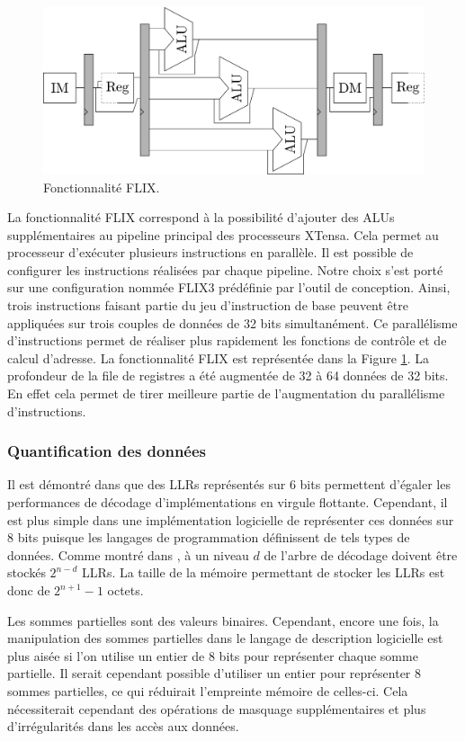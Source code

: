 \begin{figure}
\centering
\includegraphics[width=\textwidth]{main/ch3_fig/flix}
\caption{Fonctionnalité FLIX.}
\label{fig:flix}
\end{figure}

La fonctionnalité FLIX correspond à la possibilité d'ajouter des ALUs supplémentaires au pipeline principal des processeurs XTensa. Cela permet au processeur d'exécuter plusieurs instructions en parallèle. Il est possible de configurer les instructions réalisées par chaque pipeline. Notre choix s'est porté sur une configuration nommée FLIX3 prédéfinie par l'outil de conception. Ainsi, trois instructions faisant partie du jeu d'instruction de base peuvent être appliquées sur trois couples de données de 32 bits simultanément. Ce parallélisme d'instructions permet de réaliser plus rapidement les fonctions de contrôle et de calcul d'adresse. La fonctionnalité FLIX est représentée dans la Figure \ref{fig:flix}.
La profondeur de la file de registres a été augmentée de 32 à 64 données de 32 bits. En effet cela permet de tirer meilleure partie de l'augmentation du parallélisme d'instructions.

\subsubsection{Quantification des données}
Il est démontré dans \cite{sarkis_fast_2014} que des LLRs représentés sur 6 bits permettent d'égaler les performances de décodage d'implémentations en virgule flottante. Cependant, il est plus simple dans une implémentation logicielle de représenter ces données sur 8 bits puisque les langages de programmation définissent de tels types de données. Comme montré dans \cite{leroux_hardware_2011}, à un niveau $d$ de l'arbre de décodage doivent être stockés $2^{n-d}$ LLRs. La taille de la mémoire permettant de stocker les LLRs est donc de $2^{n+1}-1$ octets.

Les sommes partielles sont des valeurs binaires. Cependant, encore une fois, la manipulation des sommes partielles dans le langage de description logicielle est plus aisée si l'on utilise un entier de 8 bits pour représenter chaque somme partielle. Il serait cependant possible d'utiliser un entier pour représenter 8 sommes partielles, ce qui réduirait l'empreinte mémoire de celles-ci. Cela nécessiterait cependant des opérations de masquage supplémentaires et plus d'irrégularités dans les accès aux données.

